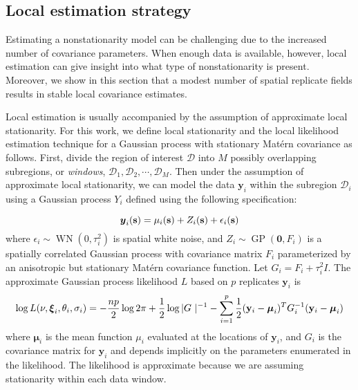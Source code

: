 \documentclass[review]{elsarticle}
\begin{document}
\subsection{Local estimation strategy}

Estimating a nonstationarity model can be challenging due to the increased number of covariance parameters. When enough data is available, however, local estimation can give insight into what type of nonstationarity is present. Moreover, we show in this section that a modest  number of spatial replicate fields results in stable local covariance estimates. 

Local estimation is usually accompanied by the assumption of approximate local stationarity. For this work, we define local stationarity and the local likelihood estimation technique for a Gaussian process with stationary Mat\'ern covariance as follows. First, divide the region of interest $\mathcal{D}$ into $M$ possibly overlapping subregions, or {\it windows},  $\mathcal{D}_1, \mathcal{D}_2, \cdots, \mathcal{D}_M$. Then under the assumption of approximate local stationarity, we can model the data $\mathbf y_i$ within the subregion $\mathcal{D}_i$ using a Gaussian process $Y_i$ defined using the following specification:

\begin{equation}
\label{e:4}
\mbox{\boldmath $y$}_i(\mathbf s) = \mu_i(\mathbf s) + Z_i (\mathbf s) + \epsilon_i (\mathbf s)    
\end{equation}
where $\epsilon_i \sim \operatorname{WN}(0, \tau_i^2)$ is spatial white noise, and $Z_i \sim \operatorname{GP}( \mathbf 0, F_i)$ is a spatially correlated Gaussian process with covariance matrix $F_i$ parameterized by an anisotropic but  stationary Mat\'ern covariance function. Let $G_i = F_i + \tau_i^2 I$. The approximate Gaussian process likelihood $L$  based on  $p$ replicates $\mathbf y_i$ is
\begin{equation}
\label{e:5}
     \log L(\nu, \mbox{\boldmath $\xi$}_i, \theta_i,  \sigma_i)  = - \frac{n p}{2} \log 2 \pi + \frac{1}{2} \log | G \ |^{-1} - \sum_{i=1}^p \frac{1}{2}(\mathbf y_i - \boldsymbol \mu_i )^T G_i^{-1} (\mathbf y_i - \boldsymbol \mu_i)
\end{equation}
where $\boldsymbol{\mu}_i$ is the mean function $\mu_i$ evaluated at the locations of $\mathbf y_i$, and $G_i$ is the covariance matrix for $\mathbf y_i$ and depends implicitly on the parameters enumerated in the likelihood. The likelihood is approximate because we are assuming stationarity within each data window.  %
\end{document}
